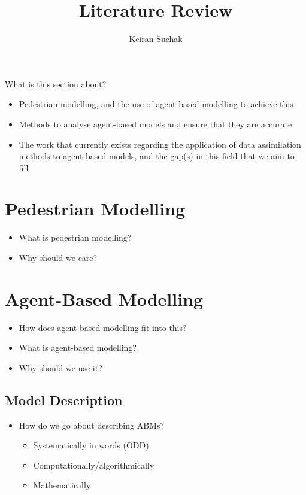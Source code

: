 \documentclass[11pt,a4paper]{article}
\begin{document}
\title{Literature Review}
\author{Keiran Suchak}

\maketitle
\tableofcontents

\newpage

What is this section about?

\begin{itemize}
    \item Pedestrian modelling, and the use of agent-based modelling to achieve
        this
    \item Methods to analyse agent-based models and ensure that they are
        accurate
    \item The work that currently exists regarding the application of data
        assimilation methods to agent-based models, and the gap(s) in this field
        that we aim to fill
\end{itemize}

\section{Pedestrian Modelling}
\label{sec:pedestrians}

\begin{itemize}
    \item What is pedestrian modelling?
    \item Why should we care?
\end{itemize}

\section{Agent-Based Modelling}
\label{sec:abms}

\begin{itemize}

    \item How does agent-based modelling fit into this?
    \item What is agent-based modelling?
    \item Why should we use it?
\end{itemize}

\subsection{Model Description}
\label{sub:abms:description}

\begin{itemize}
    \item How do we go about describing ABMs?
        \begin{itemize}
            \item Systematically in words (ODD) \citep{grimm2006standard}
            \item Computationally/algorithmically \citep{north2014theoretical}
            \item Mathematically
                \citep{hinkelmann2011mathematical,hinkelmann2011adam}
        \end{itemize}
\end{itemize}
\end{document}
